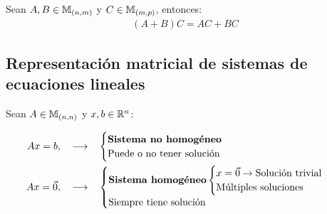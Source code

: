 \begin{teorema}
{
    \label{thm:5}
    Sean $A, B \in \mathbb{M}_{(n, m)}$ y $C \in \mathbb{M}_{(m, p)}$, entonces: \\
    \begin{align*}
        (A + B)C = AC + BC
    \end{align*}
}
\end{teorema}

\subsection{Representación matricial de sistemas de ecuaciones lineales}
\label{sec:representacion_matricial_de_sistemas_de_ecuaciones_lineales}

Sean $A \in \mathbb{M}_{(n, n)}$ y $x, b \in \mathbb{R}^n$:

\begin{align*}
    Ax = b, \quad \longrightarrow \quad &\begin{cases}
        \text{\textbf{Sistema no homogéneo}} \\ 
        \text{Puede o no tener solución}
    \end{cases} \\
    Ax = \vec{0}, \quad \longrightarrow \quad &\begin{cases}
        \text{\textbf{Sistema homogéneo}} \begin{cases}
            x = \vec{0} \rightarrow \text{Solución trivial} \\
            \text{Múltiples soluciones}
        \end{cases}\\
        \text{Siempre tiene solución}
    \end{cases}
\end{align*}

